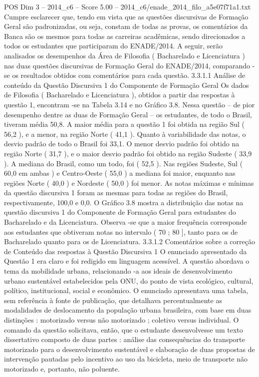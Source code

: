 \begin{textsample}{POS Dim 3 – 2014\_c6 – Score 5.00 – 2014\_c6/enade\_2014\_filo\_a5e07f71a1.txt}
Cumpre esclarecer que, tendo em vista que as questões discursivas de Formação Geral são padronizadas, ou seja, constam de todas as provas, os comentários da Banca são os mesmos para todas as carreiras acadêmicas, sendo direcionados a todos os estudantes que participaram do ENADE/2014.
A seguir, serão analisados os desempenhos da Área de Filosofia ( Bacharelado e Licenciatura ) nas duas questões discursivas de Formação Geral do ENADE/2014, comparando -se os resultados obtidos com comentários para cada questão. 3.3.1.1 Análise de conteúdo da Questão Discursiva 1 do Componente de Formação Geral Os dados de Filosofia ( Bacharelado e Licenciatura ), obtidos a partir das respostas à questão 1, encontram -se na Tabela 3.14 e no Gráfico 3.8.
Nessa questão – de pior desempenho dentre as duas de Formação Geral – os estudantes, de todo o Brasil, tiveram média 50,8.
A maior média para a questão 1 foi obtida na região Sul ( 56,2 ), e a menor, na região Norte ( 41,1 ).
Quanto à variabilidade das notas, o desvio padrão de todo o Brasil foi 33,1.
O menor desvio padrão foi obtido na região Norte ( 31,7 ), e o maior desvio padrão foi obtido na região Sudeste ( 33,9 ).
A mediana do Brasil, como um todo, foi ( 52,5 ).
Nas regiões Sudeste, Sul ( 60,0 em ambas ) e Centro-Oeste ( 55,0 ) a mediana foi maior, enquanto nas regiões Norte ( 40,0 ) e Nordeste ( 50,0 ) foi menor.
As notas máximas e mínimas da questão discursiva 1 foram as mesmas para todas as regiões do Brasil, respectivamente, 100,0 e 0,0.
O Gráfico 3.8 mostra a distribuição das notas na questão discursiva 1 do Componente de Formação Geral para estudantes do Bacharelado e da Licenciatura.
Observa -se que a maior frequência corresponde aos estudantes que obtiveram notas no intervalo ( 70 ; 80 ], tanto para os de Bacharelado quanto para os de Licenciatura. 3.3.1.2 Comentários sobre a correção de Conteúdo das respostas à Questão Discursiva 1 O enunciado apresentado da Questão 1 era claro e foi redigido em linguagem acessível.
A questão abordava o tema da mobilidade urbana, relacionando -a aos ideais de desenvolvimento urbano sustentável estabelecidos pela ONU, do ponto de vista ecológico, cultural, político, institucional, social e econômico.
O enunciado apresentava uma tabela, sem referência à fonte de publicação, que detalhava percentualmente as modalidades de deslocamento da população urbana brasileira, com base em duas distinções : motorizado versus não motorizado ; coletivo versus individual.
O comando da questão solicitava, então, que o estudante desenvolvesse um texto dissertativo composto de duas partes : análise das consequências do transporte motorizado para o desenvolvimento sustentável e elaboração de duas propostas de intervenção pautadas pelo incentivo ao uso da bicicleta, meio de transporte não motorizado e, portanto, não poluente.

\end{textsample}
